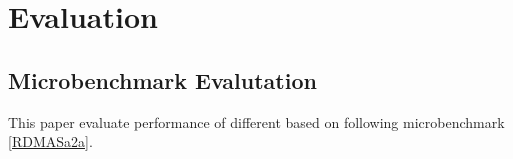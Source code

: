 \section{Evaluation}

\subsection{Microbenchmark Evalutation}
This paper evaluate performance of different based on following microbenchmark \ref{RDMASa2a}.

\begin{figure}[!htb]
  \centering



\end{figure}
